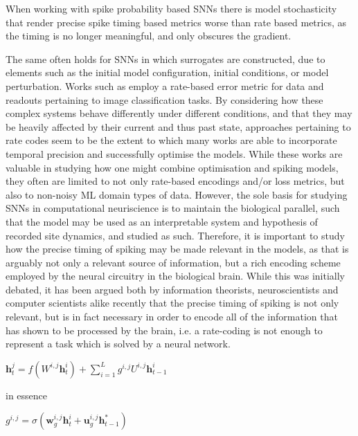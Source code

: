 \documentclass[mphil,deptreport,ai]{infthesis} %
\begin{document}
When working with spike probability based SNNs there is model stochasticity that render precise spike timing based metrics worse than rate based metrics, as the timing is no longer meaningful, and only obscures the gradient.

The same often holds for SNNs in which surrogates are constructed, due to elements such as the initial model configuration, initial conditions, or model perturbation.
Works such as \cite{Jin2018} employ a rate-based error metric for data and readouts pertaining to image classification tasks.
By considering how these complex systems behave differently under different conditions, and that they may be heavily affected by their current and thus past state, approaches pertaining to rate codes seem to be the extent to which many works are able to incorporate temporal precision and successfully optimise the models.
While these works are valuable in studying how one might combine optimisation and spiking models, they often are limited to not only rate-based encodings and/or loss metrics, but also to non-noisy ML domain types of data.
However, the sole basis for studying SNNs in computational neuriscience is to maintain the biological parallel, such that the model may be used as an interpretable system and hypothesis of recorded site dynamics, and studied as such.
Therefore, it is important to study how the precise timing of spiking may be made relevant in the models, as that is arguably not only a relevant source of information, but a rich encoding scheme employed by the neural circuitry in the biological brain.
While this was initially debated, it has been argued both by information theorists, neuroscientists and computer scientists alike recently that the precise timing of spiking is not only relevant, but is in fact necessary in order to encode all of the information that has shown to be processed by the brain, i.e. a rate-coding is not enough to represent a task which is solved by a neural network.

\begin{math}
    \textbf{h}_t^j = \textit{f}(W^{i,j}\textbf{h}_t^i) + \sum_{i=1}^L g^{i,j} U^{i,j}\textbf{h}_{t-1}^i
\end{math}

in essence

\begin{math}
    g^{i,j} = \sigma ( \textbf{w}_g^{i,j}\textbf{h}_t^{i} + \textbf{u}_g^{i,j}\textbf{h}_{t-1}^{*})
\end{math}
\end{document}
